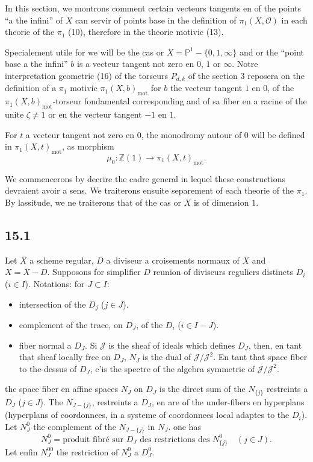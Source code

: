 \documentclass[12pt,a4paper]{article}
\theoremstyle{plain}
\theoremstyle{definition}
\theoremstyle{remark}
\newcommand{\cO}{\mathcal{O}}
\newcommand{\bZ}{\mathbb{Z}}
\newcommand{\bP}{\mathbb{P}}
\newcommand{\mot}{\mathrm{mot}}
\begin{document}
In this section, we montrons comment certain vecteurs tangents en of the points ``a the infini'' of $X$ can servir of points base in the definition of $\pi_1(X, \cO)$ in each theorie of the $\pi_1$ (10), therefore in the theorie motivic (13).

Specialement utile for we will be the cas or $X = \bP^1 - \{0, 1, \infty\}$ and or the ``point base a the infini'' $b$ is a vecteur tangent not zero en $0$, $1$ or $\infty$. Notre interpretation geometric (16) of the torseurs $P_{d,k}$ of the section 3 reposera on the definition of a $\pi_1$ motivic $\pi_1(X, b)_{\mot}$ for $b$ the vecteur tangent $1$ en $0$, of the $\pi_1(X, b)_{\mot}$-torseur fondamental corresponding and of sa fiber en a racine of the unite $\zeta \neq 1$ or en the vecteur tangent $-1$ en $1$.

For $t$ a vecteur tangent not zero en $0$, the monodromy autour of $0$ will be defined in $\pi_1(X, t)_{\mot}$, as morphism
\[
\mu_0 : \bZ(1) \to \pi_1(X, t)_{\mot}.
\]

We commencerons by decrire the cadre general in lequel these constructions devraient avoir a sens. We traiterons ensuite separement of each theorie of the $\pi_1$. By lassitude, we ne traiterons that of the cas or $X$ is of dimension $1$.

\subsection*{15.1}

Let $\overline{X}$ a scheme regular, $D$ a diviseur a croisements normaux of $\overline{X}$ and $X = \overline{X} - D$. Supposons for simplifier $D$ reunion of diviseurs reguliers distincts $D_i$ ($i \in I$). Notations: for $J \subset I$:
\begin{itemize}[nosep]
\item[$D_J$:] intersection of the $D_j$ ($j \in J$).
\item[$D_J^0$:] complement of the trace, on $D_J$, of the $D_i$ ($i \in I - J$).
\item[$N_J$:] fiber normal a $D_J$. Si $\mathcal{J}$ is the sheaf of ideals which defines $D_J$, then, en tant that sheaf locally free on $D_J$, $N_J$ is the dual of $\mathcal{J}/\mathcal{J}^2$. En tant that space fiber to the-dessus of $D_J$, c'is the spectre of the algebra symmetric of $\mathcal{J}/\mathcal{J}^2$.
\end{itemize}

the space fiber en affine spaces $N_J$ on $D_J$ is the direct sum of the $N_{\{j\}}$ restreints a $D_J$ ($j \in J$). The $N_{J-\{j\}}$, restreints a $D_J$, en are of the under-fibers en hyperplans (hyperplans of coordonnees, in a systeme of coordonnees local adaptes to the $D_i$). Let $N_J^0$ the complement of the $N_{J-\{j\}}$ in $N_J$. one has
\begin{equation}\label{eq:15.1.1}
N_J^0 = \text{produit fibré sur } D_J \text{ des restrictions des } N_{\{j\}}^0 \quad (j \in J).
\end{equation}
Let enfin $N_J^{00}$ the restriction of $N_J^0$ a $D_J^0$.
\end{document}
